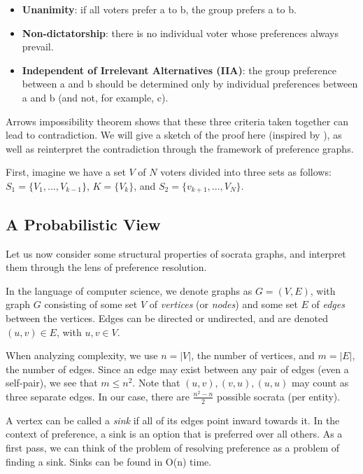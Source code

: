 \begin{itemize}
	\item \textbf{Unanimity}: if all voters prefer a to b, the group prefers a to b.
	\item \textbf{Non-dictatorship}: there is no individual voter whose preferences always prevail.
	\item \textbf{Independent of Irrelevant Alternatives (IIA)}: the group preference between a and b should be determined only by individual preferences between a and b (and not, for example, c).
\end{itemize}

Arrows impossibility theorem shows that these three criteria taken together can lead to contradiction.
We will give a sketch of the proof here (inspired by \cite{geanakoplos:2005}), as well as reinterpret the contradiction through the framework of preference graphs.

\bigskip

First, imagine we have a set $V$ of $N$ voters divided into three sets as follows: $S_1 = \{V_1, ..., V_{k-1}\}$, $K = \{V_k\}$, and $S_2 = \{v_{k+1}, ..., V_N\}$.




\subsection{A Probabilistic View}

Let us now consider some structural properties of socrata graphs, and interpret them through the lens of preference resolution.

In the language of computer science, we denote graphs as $G = (V, E)$, with graph $G$ consisting of some set $V$ of \textit{vertices} (or \textit{nodes}) and some set $E$ of \textit{edges} between the vertices.
Edges can be directed or undirected, and are denoted $(u,v) \in E$, with $u, v \in V$.

When analyzing complexity, we use $n = |V|$, the number of vertices, and $m = |E|$, the number of edges.
Since an edge may exist between any pair of edges (even a self-pair), we see that $m \leq n^2$.
Note that $(u,v), (v,u), (u,u)$ may count as three separate edges.
In our case, there are $\frac{n^2-n}{2}$ possible socrata (per entity).

A vertex can be called a \textit{sink} if all of its edges point inward towards it.
In the context of preference, a sink is an option that is preferred over all others.
As a first pass, we can think of the problem of resolving preference as a problem of finding a sink.
Sinks can be found in O(n) time.

